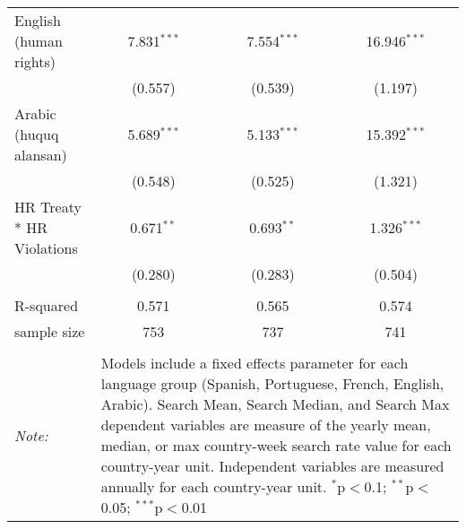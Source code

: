 \begin{table}[!htbp]
\begin{tabular}{@{\extracolsep{5pt}}lccc}
  English (human rights) & 7.831$^{***}$ & 7.554$^{***}$ & 16.946$^{***}$ \\ 
  & (0.557) & (0.539) & (1.197) \\ 
  Arabic (huquq alansan) & 5.689$^{***}$ & 5.133$^{***}$ & 15.392$^{***}$ \\ 
  & (0.548) & (0.525) & (1.321) \\ 
  HR Treaty * HR Violations & 0.671$^{**}$ & 0.693$^{**}$ & 1.326$^{***}$ \\ 
  & (0.280) & (0.283) & (0.504) \\ 
 \hline \\[-1.8ex] 
R-squared  & 0.571 & 0.565 & 0.574 \\ 
sample size  & 753 & 737 & 741 \\ 
\hline 
\hline \\[-1.8ex] 
\textit{Note:}  & \multicolumn{3}{l}{\parbox[t]{8cm}{Models include a fixed effects parameter for each language group (Spanish, Portuguese, French, English, Arabic). Search Mean, Search Median, and Search Max dependent variables are measure of the yearly mean, median, or max country-week search rate value for each country-year unit. Independent variables are measured annually for each country-year unit. $^{*}$p$<$0.1; $^{**}$p$<$0.05; $^{***}$p$<$0.01}} \\ 
\end{tabular} 
\end{table} 
